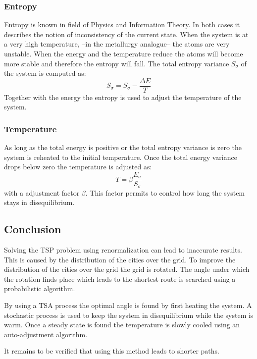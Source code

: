 \subsubsection{Entropy}
Entropy is known in field of Physics and Information Theory. In both cases it
describes the notion of inconsistency of the current state. When the system is
at a very high temperature, --in the metallurgy analogue-- the atoms are very
unstable. When the energy and the temperature reduce the atoms will become
more stable and therefore the entropy will fall. The total entropy variance
$S_\sigma$ of the system is computed as:
\begin{equation}\label{eq:entropy}
S_\sigma = S_\sigma - \frac{\Delta E}{T}
\end{equation}
Together with the energy the entropy is used to adjust the temperature of the
system.

\subsubsection{Temperature}
As long as the total energy is positive or the total entropy variance is zero
the system is reheated to the initial temperature. Once the total energy
variance drops below zero the temperature is adjusted as:
\begin{equation}\label{eq:tempadj}
T = \beta\frac{E_\sigma}{S_\sigma}
\end{equation}
with a adjustment factor $\beta$. This factor permits to control how long the
system stays in disequilibrium. 

\subsection{Conclusion}
Solving the TSP problem using renormalization can lead to inaccurate results. This is
caused by the distribution of the cities over the grid. To improve the
distribution of the cities over the grid the grid is rotated. The angle under
which the rotation finds place which leads to the shortest route is searched
using a probabilistic algorithm. 

By using a TSA process the optimal angle is found by first
heating the system. A stochastic process is used to keep the system in
disequilibrium while the system is warm. Once a steady state is found the
temperature is slowly cooled using an auto-adjustment algorithm.

It remains to be verified that using this method leads to shorter paths.


